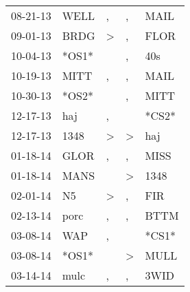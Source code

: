 \begin{supertabular}{p{0.07\textwidth}p{0.06\textwidth}p{0.02\textwidth}p{0.02\textwidth}p{0.06\textwidth}}
          08-21-13\textsuperscript{} &           WELL\textsuperscript{} &                , &                , &           MAIL\textsuperscript{} \\
          09-01-13\textsuperscript{} &           BRDG\textsuperscript{} &     \textgreater &                , &           FLOR\textsuperscript{} \\
          10-04-13\textsuperscript{} &                            *OS1* &                  &                , &            40s\textsuperscript{} \\
          10-19-13\textsuperscript{} &           MITT\textsuperscript{} &                , &                , &           MAIL\textsuperscript{} \\
          10-30-13\textsuperscript{} &                            *OS2* &                  &                , &           MITT\textsuperscript{} \\
          12-17-13\textsuperscript{} &            haj\textsuperscript{} &                , &                  &                            *CS2* \\
          12-17-13\textsuperscript{} &           1348\textsuperscript{} &     \textgreater &     \textgreater &            haj\textsuperscript{} \\
          01-18-14\textsuperscript{} &           GLOR\textsuperscript{} &                , &                , &           MISS\textsuperscript{} \\
          01-18-14\textsuperscript{} &           MANS\textsuperscript{} &                  &     \textgreater &           1348\textsuperscript{} \\
          02-01-14\textsuperscript{} &             N5\textsuperscript{} &     \textgreater &                , &            FIR\textsuperscript{} \\
          02-13-14\textsuperscript{} &           porc\textsuperscript{} &                , &                , &           BTTM\textsuperscript{} \\
          03-08-14\textsuperscript{} &            WAP\textsuperscript{} &                , &                  &                            *CS1* \\
          03-08-14\textsuperscript{} &                            *OS1* &                  &     \textgreater &           MULL\textsuperscript{} \\
          03-14-14\textsuperscript{} &           mulc\textsuperscript{} &                , &                , &           3WID\textsuperscript{} \\

\end{supertabular}
